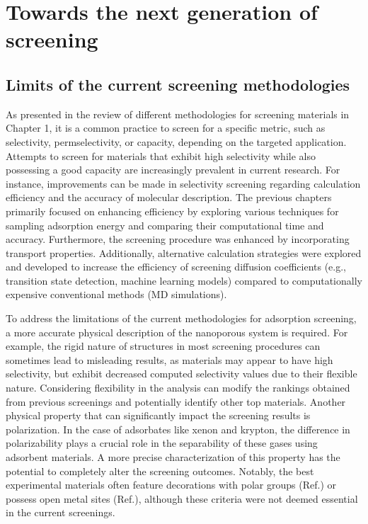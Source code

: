 \documentclass[main]{subfiles}
\begin{document}
\chapter{Towards the next generation of screening}
\vspace*{-1\baselineskip}

\section{Limits of the current screening methodologies}

As presented in the review of different methodologies for screening materials in Chapter 1, it is a common practice to screen for a specific metric, such as selectivity, permselectivity, or capacity, depending on the targeted application. Attempts to screen for materials that exhibit high selectivity while also possessing a good capacity are increasingly prevalent in current research\autocite{Chung_2019,Zhang_2022,Solanki_2020}. For instance, improvements can be made in selectivity screening regarding calculation efficiency and the accuracy of molecular description. The previous chapters primarily focused on enhancing efficiency by exploring various techniques for sampling adsorption energy and comparing their computational time and accuracy. Furthermore, the screening procedure was enhanced by incorporating transport properties. Additionally, alternative calculation strategies were explored and developed to increase the efficiency of screening diffusion coefficients (e.g., transition state detection, machine learning models) compared to computationally expensive conventional methods (MD simulations).

To address the limitations of the current methodologies for adsorption screening, a more accurate physical description of the nanoporous system is required. For example, the rigid nature of structures in most screening procedures can sometimes lead to misleading results, as materials may appear to have high selectivity, but exhibit decreased computed selectivity values due to their flexible nature. Considering flexibility in the analysis can modify the rankings obtained from previous screenings and potentially identify other top materials. Another physical property that can significantly impact the screening results is polarization. In the case of adsorbates like xenon and krypton, the difference in polarizability plays a crucial role in the separability of these gases using adsorbent materials. A more precise characterization of this property has the potential to completely alter the screening outcomes. Notably, the best experimental materials often feature decorations with polar groups (Ref.\cite{Li_2019}) or possess open metal sites (Ref.\cite{Pei_2022}), although these criteria were not deemed essential in the current screenings.
\end{document}
